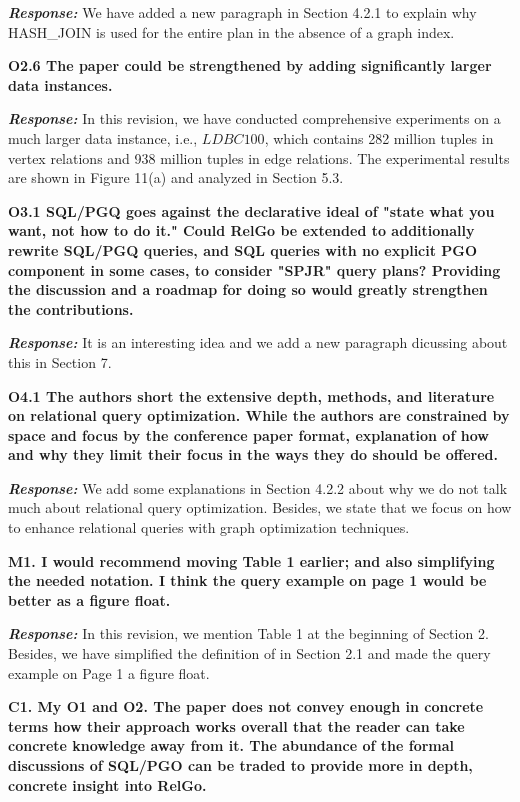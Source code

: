 \textbf{\textit{Response: }}
We have added a new paragraph in Section 4.2.1 to explain why HASH\_JOIN is used for the entire plan in the absence of a graph index.


\textbf{
O2.6 The paper could be strengthened by adding significantly larger data instances.}

\textbf{\textit{Response: }}
In this revision, we have conducted comprehensive experiments on a much larger data instance, i.e., $LDBC100$, which contains 282 million tuples in vertex relations and 938 million tuples in edge relations.
The experimental results are shown in Figure 11(a) and analyzed in Section 5.3.


\textbf{O3.1 SQL/PGQ goes against the declarative ideal of "state what you want, not how to do it." 
Could RelGo be extended to additionally rewrite SQL/PGQ queries, and SQL queries with no explicit PGO component in some cases, to consider "SPJR" query plans? 
Providing the discussion and a roadmap for doing so would greatly strengthen the contributions.}

\textbf{\textit{Response: }}
It is an interesting idea and we add a new paragraph dicussing about this in Section 7.

\textbf{O4.1 The authors short the extensive depth, methods, and literature on relational query optimization. While the authors are constrained by space and focus by the conference paper format, explanation of how and why they limit their focus in the ways they do should be offered. }

\textbf{\textit{Response: }}
We add some explanations in Section 4.2.2 about why we do not talk much about relational query optimization.
Besides, we state that we focus on how to enhance relational queries with graph optimization techniques. 


\textbf{M1. I would recommend moving Table 1 earlier; and also simplifying the needed notation. I think the query example on page 1 would be better as a figure float. }

\textbf{\textit{Response: }}
In this revision, we mention Table 1 at the beginning of Section 2.
Besides, we have simplified the definition of \rgmapping in Section 2.1 and made the query example on Page 1 a figure float. 


\textbf{
C1. My O1 and O2. The paper does not convey enough in concrete terms how their approach works overall that the reader can take concrete knowledge away from it. The abundance of the formal discussions of SQL/PGO can be traded to provide more in depth, concrete insight into RelGo.}

